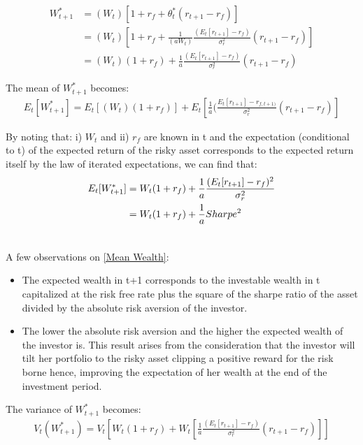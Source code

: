 \documentclass[12pt]{article}
\begin{document}
	\begin{align*}
		W_{t+1}^{*} &= (W_t) \left[1 + r_f + \theta_t^*(r_{t+1}-r_f) \right]\\
		&= (W_t) \left[1 + r_f + \frac{1}{(aW_t)}\frac{(E_{t}[r_{t+1}]-r_f)}{\sigma_r^2}(r_{t+1}-r_f) \right]\\
		&= (W_t)(1 + r_f) + \frac{1}{a}\frac{(E_{t}[r_{t+1}]-r_f)}{\sigma_r^2}(r_{t+1}-r_f)
	\end{align*} \vspace{-1.35em}
	
	The mean of $W_{t+1}^{*}$ becomes:
	\begin{align*}
		E_{t}[W_{t+1}^{*}] = E_{t}[(W_t)(1 + r_f)] + E_{t}[\frac{1}{a}(\frac{E_{t}[r_{t+1}]-r_{f, t+1)}}{\sigma_r^2}(r_{t+1}-r_f)]
	\end{align*} \vspace{-1.25em}
	
	By noting that: i) $W_t$ and ii) $r_f$ are known in t and the expectation (conditional to t) of the expected return of the risky asset corresponds to the expected return itself by the law of iterated expectations, we can find that:    
	\begin{align} \label{Mean Wealth}
		E_{t}[W_{t+1}^{*}] &= W_t(1 + r_f) + \frac{1}{a}\frac{(E_{t}[r_{t+1}]-r_f)^2}{\sigma_r^2} \notag\\
		&= W_t(1 + r_f) + \frac{1}{a}Sharpe^2 \\ \notag
	\end{align} \vspace{-3.25em}  
	
	A few observations on \ref{Mean Wealth}:
	\begin{itemize}
		\item The expected wealth in t+1 corresponds to the investable wealth in t capitalized at the risk free rate plus the square of the sharpe ratio of the asset divided by the absolute risk aversion of the investor.
		\item The lower the absolute risk aversion and the higher the expected wealth of the investor is. This result arises from the consideration that the investor will tilt her portfolio to the risky asset clipping a positive reward for the risk borne hence, improving the expectation of her wealth at the end of the investment period.       
	\end{itemize}
	
	The variance of $W_{t+1}^{*}$ becomes: \vspace{-0.5em}
	\begin{align*}
		V_{t}(W_{t+1}^{*}) = V_{t}[W_t(1 + r_f) + W_t[\frac{1}{a}\frac{(E_{t}[r_{t+1}]-r_f)}{\sigma_r^{2}}(r_{t+1}-r_f)]]
	\end{align*} \vspace{-1.75em}
	
\end{document}
